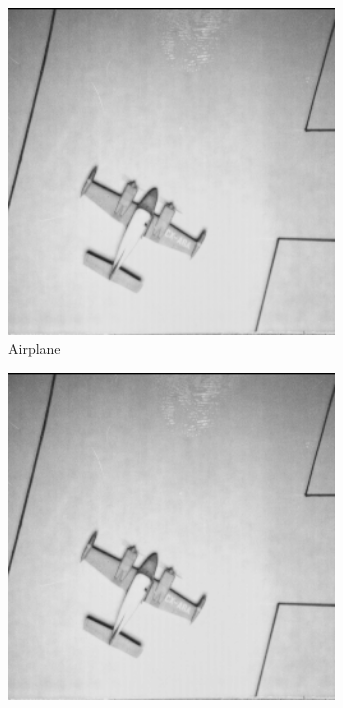 \begin{figure}
\begin{subfigure}[b]{.23\textwidth}
  \centering
  \includegraphics[width=0.95\textwidth]{figures/test-images/original/airplane}
  \caption{Airplane}
  \label{fig:test-images-airplane-original}
\end{subfigure}
\begin{subfigure}[b]{.23\textwidth}
  \centering
  \includegraphics[width=0.95\textwidth]{figures/test-images/truncate1/airplane}

\end{subfigure}
\end{figure}
